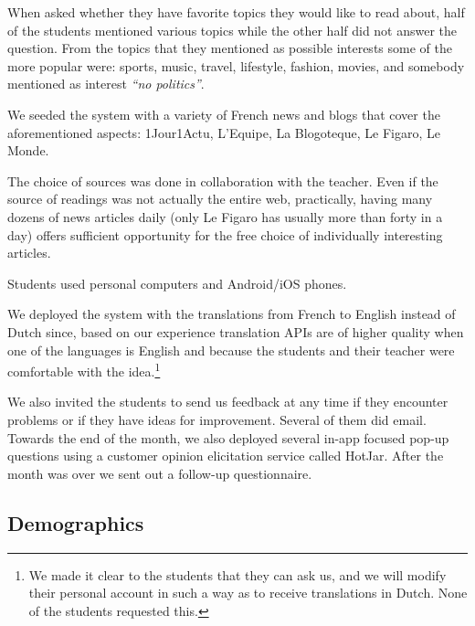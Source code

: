 When asked whether they have favorite topics they would like to read about, half of the students mentioned various topics while the other half did not answer the question. From the topics that they mentioned as possible interests some of the more popular were: sports, music, travel, lifestyle, fashion, movies, and somebody mentioned as interest {\em ``no politics''}.


We seeded the system with a variety of French news and blogs that cover the aforementioned aspects: 1Jour1Actu, L'Equipe, La Blogoteque, Le Figaro, Le Monde. 

\begin{added}
	
	The choice of sources was done in collaboration with the teacher. Even if the source of readings was not actually the entire web, practically, having many dozens of news articles daily (only Le Figaro has usually more than forty in a day) offers sufficient opportunity for the free choice of individually interesting articles. 
	
\end{added}



\begin{added}
Students used personal computers and Android/iOS phones.
\end{added}

	We deployed the system with the translations from French to English instead of Dutch since, based on our experience translation APIs are of higher quality when one of the languages is English and because the students and their teacher were comfortable with the idea.\footnote{We made it clear to the students that they can ask us, and we will modify their personal account in such a way as to receive translations in Dutch. None of the students requested this.}

We also invited the students to send us feedback at any time if they encounter problems or if they have ideas for improvement. Several of them did email. Towards the end of the month, we also deployed several in-app focused pop-up questions using a customer opinion elicitation service called HotJar. After the month was over we sent out a follow-up questionnaire.




\subsection{Demographics}


